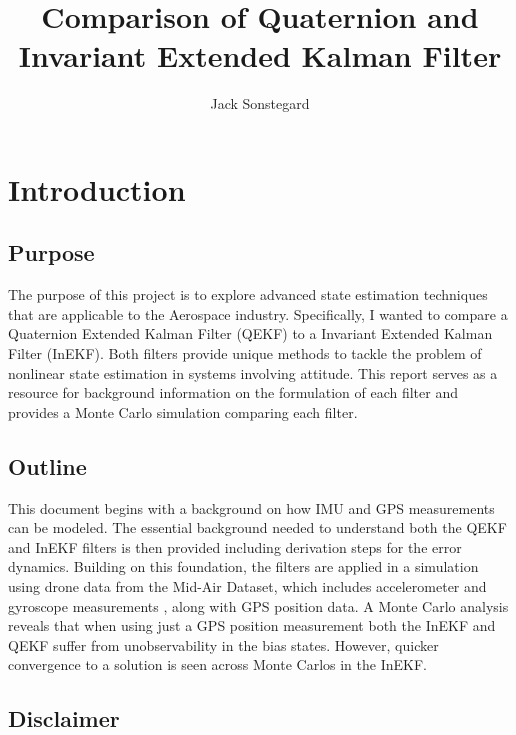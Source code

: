 \title{Comparison of Quaternion and Invariant Extended Kalman Filter}
\author{Jack Sonstegard}

\maketitle

\section{Introduction}
\subsection{Purpose}

The purpose of this project is to explore advanced state estimation techniques that are applicable to the Aerospace industry. Specifically, I wanted to compare a Quaternion Extended Kalman Filter (QEKF) to a Invariant Extended Kalman Filter (InEKF). Both filters provide unique methods to tackle the problem of nonlinear state estimation in systems involving attitude. This report serves as a resource for background information on the formulation of each filter and provides a Monte Carlo simulation comparing each filter.

\subsection{Outline}

This document begins with a background on how IMU and GPS measurements can be modeled. The essential background needed to understand both the QEKF and InEKF filters is then provided including derivation steps for the error dynamics. Building on this foundation, the filters are applied in a simulation using drone data from the Mid-Air Dataset, which includes accelerometer and gyroscope measurements \cite{Fonder2019MidAir}, along with GPS position data. A Monte Carlo analysis reveals that when using just a GPS position measurement both the InEKF and QEKF suffer from unobservability in the bias states. However, quicker convergence to a solution is seen across Monte Carlos in the InEKF.

\subsection{Disclaimer}

